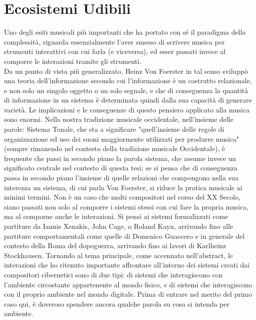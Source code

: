 \section{Ecosistemi Udibili}
\label{sec:Ecosistemi Udibili}

Uno degli esiti musicali più importanti che ha portato con sé 
il paradigma della complessità, riguarda essenzialmente l'aver smesso di 
scrivere musica per strumenti interattivi con cui farla (e viceversa), 
ed esser passati invece al  comporre le interazioni tramite gli strumenti. \\
Da un punto di vista più generalizzato, Heinz Von Foerster in tal senso 
sviluppò una teoria dell'informazione secondo cui l'informazione è un costrutto relazionale, 
e non solo un singolo oggetto o un solo segnale, 
e che di conseguenza la quantità di informazione in un sistema è determinata 
quindi dalla sua capacità di generare varietà.
Le implicazioni e le conseguenze di questo pensiero applicato alla musica sono enormi.
Nella nostra tradizione musicale occidentale, nell'insieme delle parole: Sistema Tonale, 
che sta a significare "quell'insieme delle regole di organizzazione ed uso dei
suoni maggiormente utilizzati per produrre musica" 
(sempre rimanendo nel contesto della tradizione musicale Occidentale), 
è frequente che passi in secondo piano la parola 
sistema, che assume invece un significato centrale nel contesto di questa tesi;
se si pensa che di conseguenza passa in secondo piano l'insieme di quelle relazioni
che compongono nella sua interezza un sistema, di cui parla Von Foerster, 
si riduce la pratica musicale ai minimi termini.
Non è un caso che molti compositori nel corso del XX Secolo, siano passati non solo al comporre 
i sistemi stessi con cui fare la propria musica, ma al comporne anche le interazioni.
Si pensi ai sistemi formalizzati come partiture da Iannis Xenakis, John Cage, o Roland Kayn,
arrivando fino alle partiture comportamentali come quelle di Domenico Guaccero e 
in generale del contesto della Roma del dopoguerra, arrivando fino ai lavori di 
Karlheinz Stockhausen.
Tornando al tema principale, come accennato nell'abstract, 
le interazioni che ho ritenuto importante affrontare 
all'interno dei sistemi creati dai compositori cibernetici sono di due tipi:
di sistemi che interagiscono con l’ambiente circostante appartenente al mondo fisico, 
e di sistemi che interagiscono con il proprio ambiente nel mondo digitale.
Prima di entrare nel merito del primo caso qui,
è doveroso spendere ancora qualche parola su cosa
si intenda per ambiente. \\

